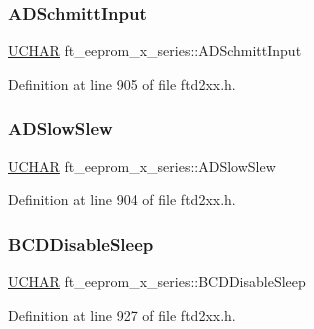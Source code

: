 \subsubsection{\texorpdfstring{A\+D\+Schmitt\+Input}{ADSchmittInput}}
{\footnotesize\ttfamily \hyperlink{CatCaloProto40MHz_2inc_2WinTypes_8h_a4f4bb67531a9bf6f0b9c6ad76aeba587}{U\+C\+H\+AR} ft\+\_\+eeprom\+\_\+x\+\_\+series\+::\+A\+D\+Schmitt\+Input}



Definition at line 905 of file ftd2xx.\+h.

\mbox{\label{structft__eeprom__x__series_a3a1988ab68373c2fdc375cb4c038666f}} 
\subsubsection{\texorpdfstring{A\+D\+Slow\+Slew}{ADSlowSlew}}
{\footnotesize\ttfamily \hyperlink{CatCaloProto40MHz_2inc_2WinTypes_8h_a4f4bb67531a9bf6f0b9c6ad76aeba587}{U\+C\+H\+AR} ft\+\_\+eeprom\+\_\+x\+\_\+series\+::\+A\+D\+Slow\+Slew}



Definition at line 904 of file ftd2xx.\+h.

\mbox{\label{structft__eeprom__x__series_ae65d73af8851dffca3c7a3f95af27196}} 
\subsubsection{\texorpdfstring{B\+C\+D\+Disable\+Sleep}{BCDDisableSleep}}
{\footnotesize\ttfamily \hyperlink{CatCaloProto40MHz_2inc_2WinTypes_8h_a4f4bb67531a9bf6f0b9c6ad76aeba587}{U\+C\+H\+AR} ft\+\_\+eeprom\+\_\+x\+\_\+series\+::\+B\+C\+D\+Disable\+Sleep}



Definition at line 927 of file ftd2xx.\+h.

\mbox{\label{structft__eeprom__x__series_a168ac848d6e1e6b9e29b8740d20dbf2b}} 
